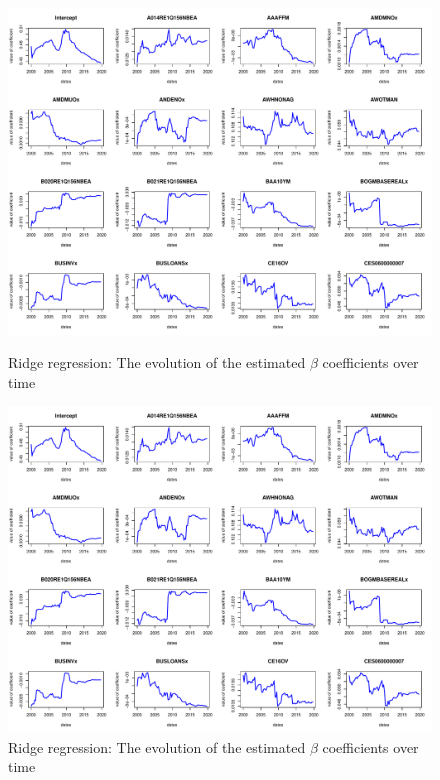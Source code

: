 \documentclass{article}
\begin{document}
\begin{subfigures}
\begin{figure}[hbt!]
\includegraphics[page = 7, width=\textwidth]{plots/ridge_betas}
\label{fig:ridge_betas}
\caption{\label{seventh}Ridge regression: The evolution of the estimated $\beta$ coefficients over time}
\centering
\end{figure}

\begin{figure}[hbt!]
\includegraphics[page = 8, width=\textwidth]{plots/ridge_betas}
\caption{\label{eighth}Ridge regression: The evolution of the estimated $\beta$ coefficients over time}
\label{fig:ridge_betas}
\centering
\end{figure}


\end{subfigures}
\end{document}
